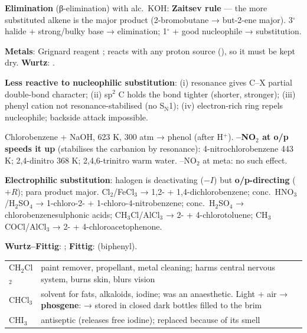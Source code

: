 \documentclass[9pt,a4paper]{extarticle}
\newcommand{\nr}[1]{\textbf{\color{uc!85!black}#1}}
\begin{document}
\begin{multicols}{2}
\begin{fl}
\item \textbf{Elimination} (β-elimination) with alc.\ KOH: \nr{Zaitsev rule} — the more substituted alkene is the major product (2-bromobutane → but-2-ene major). 3$^\circ$ halide + strong/bulky base → elimination; 1$^\circ$ + good nucleophile → substitution.
\item \textbf{Metals}: Grignard reagent ; reacts with any proton source (), so it must be kept dry. \nr{Wurtz}: .
\end{fl}
\begin{fl}
\item \textbf{Less reactive to nucleophilic substitution}: (i) resonance gives C--X partial double-bond character; (ii) sp$^2$ C holds the bond tighter (shorter, stronger); (iii) phenyl cation not resonance-stabilised (no S$_\text{N}$1); (iv) electron-rich ring repels nucleophile; backside attack impossible.
\item Chlorobenzene + NaOH, 623 K, 300 atm → phenol (after H$^+$). \textbf{–NO$_2$ at o/p speeds it up} (stabilises the carbanion by resonance): 4-nitrochlorobenzene 443 K; 2,4-dinitro 368 K; 2,4,6-trinitro warm water. –NO$_2$ at meta: no such effect.
\item \textbf{Electrophilic substitution}: halogen is deactivating ($-I$) but \textbf{o/p-directing} ($+R$); para product major. Cl$_2$/FeCl$_3$ → 1,2- + 1,4-dichlorobenzene; conc.\ HNO$_3$/H$_2$SO$_4$ → 1-chloro-2- + 1-chloro-4-nitrobenzene; conc.\ H$_2$SO$_4$ → chlorobenzenesulphonic acids; CH$_3$Cl/AlCl$_3$ → 2- + 4-chlorotoluene; CH$_3$COCl/AlCl$_3$ → 2- + 4-chloroacetophenone.
\item \nr{Wurtz--Fittig}: ; \nr{Fittig}:  (biphenyl).
\end{fl}
{\scriptsize\setlength{\tabcolsep}{2pt}
\begin{tabularx}{\linewidth}{@{}l Y@{}}
\toprule
CH$_2$Cl$_2$ & paint remover, propellant, metal cleaning; harms central nervous system, burns skin, blurs vision\\
CHCl$_3$ & solvent for fats, alkaloids, iodine; was an anaesthetic. Light + air → \textbf{phosgene}:  → stored in closed dark bottles filled to the brim\\
CHI$_3$ & antiseptic (releases free iodine); replaced because of its smell\\

\end{tabularx}}
\end{multicols}
\end{document}
